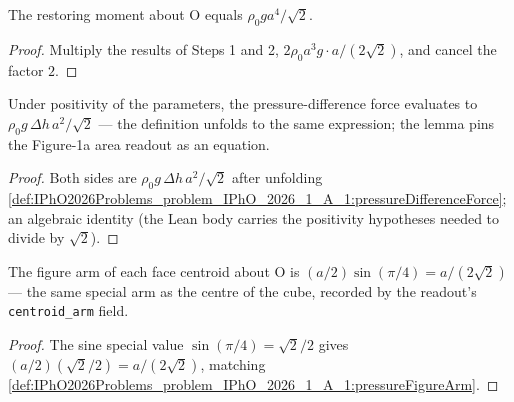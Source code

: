 \begin{lemma}
\label{lem:IPhO2026Problems_problem_IPhO_2026_1_A_1:restoring_moment_eq}
The restoring moment about O equals $\rho_0 g a^4/\sqrt{2}$.
\end{lemma}
\begin{proof}
Multiply the results of Steps 1 and 2,
$2\rho_0 a^3 g \cdot a/(2\sqrt{2})$, and cancel the factor $2$.
\end{proof}

\begin{lemma}
\label{lem:IPhO2026Problems_problem_IPhO_2026_1_A_1:pressure_difference_force_eq}
Under positivity of the parameters, the pressure-difference force
evaluates to $\rho_0 g\, \Delta h\, a^2/\sqrt{2}$ --- the definition
unfolds to the same expression; the lemma pins the Figure-1a area readout
as an equation.
\end{lemma}
\begin{proof}
Both sides are $\rho_0 g\, \Delta h\, a^2/\sqrt{2}$ after unfolding
\cref{def:IPhO2026Problems_problem_IPhO_2026_1_A_1:pressureDifferenceForce};
an algebraic identity (the Lean body carries the positivity hypotheses
needed to divide by $\sqrt{2}$).
\end{proof}

\begin{lemma}
\label{lem:IPhO2026Problems_problem_IPhO_2026_1_A_1:pressure_figure_arm_eq}
The figure arm of each face centroid about O is
$(a/2)\sin(\pi/4) = a/(2\sqrt{2})$ --- the same special arm as the centre
of the cube, recorded by the readout's \texttt{centroid\_arm} field.
\end{lemma}
\begin{proof}
The sine special value $\sin(\pi/4) = \sqrt{2}/2$ gives
$(a/2)(\sqrt{2}/2) = a/(2\sqrt{2})$, matching
\cref{def:IPhO2026Problems_problem_IPhO_2026_1_A_1:pressureFigureArm}.
\end{proof}

